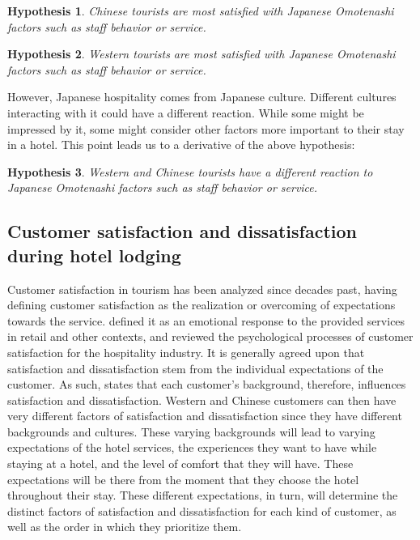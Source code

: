 \documentclass[smallextended,natbib]{svjour3}       %
\makeatletter
\newtheorem{hyp}{Hypothesis}
\newcounter{subhyp}
\newenvironment{subhyp}
 {%
  \setcounter{subhyp}{0}%
  \stepcounter{hyp}%
  \edef\saved@hyp{\thehyp}%
  \let\c@hyp\c@subhyp     %
  \renewcommand{\thehyp}{\saved@hyp\alph{hyp}}%
 }
 {}
\makeatother
\begin{document}
\begin{subhyp}
\begin{hyp}
\label{hyp:omotenashi_zh}
Chinese tourists are most satisfied with Japanese \textit{Omotenashi} factors such as staff behavior or service.
\end{hyp}

\begin{hyp}
\label{hyp:omotenashi_en}
Western tourists are most satisfied with Japanese \textit{Omotenashi} factors such as staff behavior or service.
\end{hyp}

However, Japanese hospitality comes from Japanese culture. Different cultures interacting with it could have a different reaction. While some might be impressed by it, some might consider other factors more important to their stay in a hotel. This point leads us to a derivative of the above hypothesis:

\begin{hyp}
\label{hyp:omotenashi_both}
Western and Chinese tourists have a different reaction to Japanese \textit{Omotenashi} factors such as staff behavior or service.
\end{hyp}
\end{subhyp}

\subsection{Customer satisfaction and dissatisfaction during hotel lodging}\label{theory_satisfaction}

Customer satisfaction in tourism has been analyzed since decades past, \cite{hunt1975} having defining customer satisfaction as the realization or overcoming of expectations towards the service. \cite{oliver1981} defined it as an emotional response to the provided services in retail and other contexts, and \cite{oh1996} reviewed the psychological processes of customer satisfaction for the hospitality industry. It is generally agreed upon that satisfaction and dissatisfaction stem from the individual expectations of the customer. As such, \cite{engel1990} states that each customer's background, therefore, influences satisfaction and dissatisfaction. Western and Chinese customers can then have very different factors of satisfaction and dissatisfaction since they have different backgrounds and cultures. These varying backgrounds will lead to varying expectations of the hotel services, the experiences they want to have while staying at a hotel, and the level of comfort that they will have. These expectations will be there from the moment that they choose the hotel throughout their stay. These different expectations, in turn, will determine the distinct factors of satisfaction and dissatisfaction for each kind of customer, as well as the order in which they prioritize them. 
\end{document}
